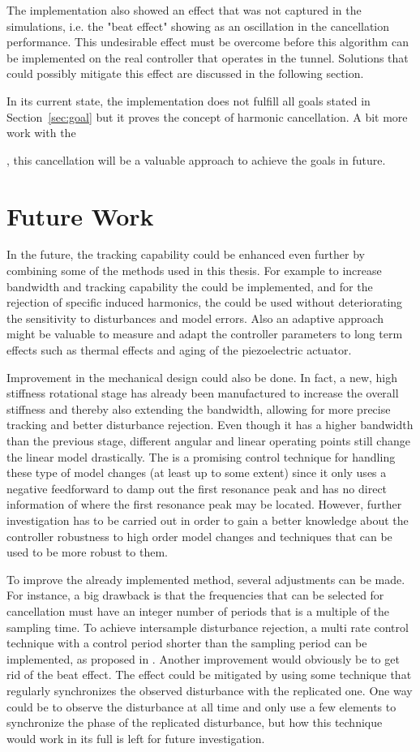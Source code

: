 The implementation also showed an effect that was not captured in the simulations, i.e. the "beat effect" showing as an oscillation in the cancellation performance. This undesirable effect must be overcome before this algorithm can be implemented on the real controller that operates in the \abbrLHC tunnel. Solutions that could possibly mitigate this effect are discussed in the following section.

In its current state, the implementation does not fulfill all goals stated in Section~\ref{sec:goal} but it proves the concept of harmonic cancellation. A bit more work with the


, this cancellation will be a valuable approach to achieve the goals in future.


\section{Future Work}
In the future, the tracking capability could be enhanced even further by combining some of the methods used in this thesis. For example to increase bandwidth and tracking capability the \abbrIRC could be implemented, and for the rejection of specific induced harmonics, the \abbrRFDC could be used without deteriorating the sensitivity to disturbances and model errors. Also an adaptive approach might be valuable to measure and adapt the controller parameters to long term effects such as thermal effects and aging of the piezoelectric actuator.

Improvement in the mechanical design could also be done. In fact, a new, high stiffness rotational stage has already been manufactured to increase the overall stiffness and thereby also extending the bandwidth, allowing for more precise tracking and better disturbance rejection. Even though it has a higher bandwidth than the previous stage, different angular and linear operating points still change the linear model drastically. The \abbrIRC is a promising control technique for handling these type of model changes (at least up to some extent) since it only uses a negative feedforward to damp out the first resonance peak and has no direct information of where the first resonance peak may be located. However, further investigation has to be carried out in order to gain a better knowledge about the controller robustness to high order model changes and techniques that can be used to be more robust to them.

To improve the already implemented \abbrRFDC method, several adjustments can be made. For instance, a big drawback is that the frequencies that can be selected for cancellation must have an integer number of periods that is a multiple of the sampling time. To achieve intersample disturbance rejection, a multi rate control technique with a control period shorter than the sampling period can be implemented, as proposed in \citep{fujimoto2009rro}. Another improvement would obviously be to get rid of the beat effect. The effect could be mitigated by using some technique that regularly synchronizes the observed disturbance with the replicated one. One way could be to observe the disturbance at all time and only use a few elements to synchronize the phase of the replicated disturbance, but how this technique would work in its full is left for future investigation.
